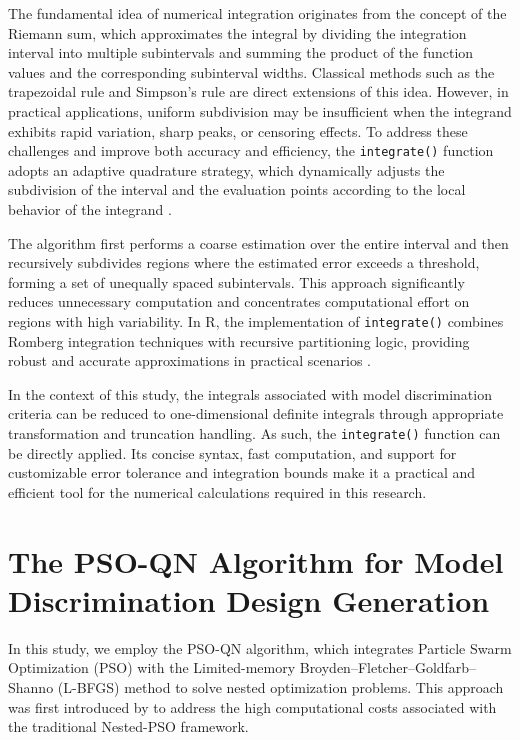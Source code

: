 \hspace*{8mm} The fundamental idea of numerical integration originates from the concept of the Riemann sum, which approximates the integral by dividing the integration interval into multiple subintervals and summing the product of the function values and the corresponding subinterval widths. Classical methods such as the trapezoidal rule and Simpson's rule are direct extensions of this idea. However, in practical applications, uniform subdivision may be insufficient when the integrand exhibits rapid variation, sharp peaks, or censoring effects. To address these challenges and improve both accuracy and efficiency, the \verb|integrate()| function adopts an adaptive quadrature strategy, which dynamically adjusts the subdivision of the interval and the evaluation points according to the local behavior of the integrand \citep{davis2007methods}.

\hspace*{8mm} The algorithm first performs a coarse estimation over the entire interval and then recursively subdivides regions where the estimated error exceeds a threshold, forming a set of unequally spaced subintervals. This approach significantly reduces unnecessary computation and concentrates computational effort on regions with high variability. In R, the implementation of \verb|integrate()| combines Romberg integration techniques with recursive partitioning logic, providing robust and accurate approximations in practical scenarios \citep{stoer1980introduction}.

\hspace*{8mm} In the context of this study, the integrals associated with model discrimination criteria can be reduced to one-dimensional definite integrals through appropriate transformation and truncation handling. As such, the \verb|integrate()| function can be directly applied. Its concise syntax, fast computation, and support for customizable error tolerance and integration bounds make it a practical and efficient tool for the numerical calculations required in this research.


\section{The PSO-QN Algorithm for Model Discrimination Design Generation}

\hspace*{8mm} In this study, we employ the PSO-QN algorithm, which integrates Particle Swarm Optimization (PSO) with the Limited-memory Broyden–Fletcher–Goldfarb–Shanno (L-BFGS) method to solve nested optimization problems. This approach was first introduced by \cite{chen2020hybrid} to address the high computational costs associated with the traditional Nested-PSO \citep{chen2015minimax} framework.

